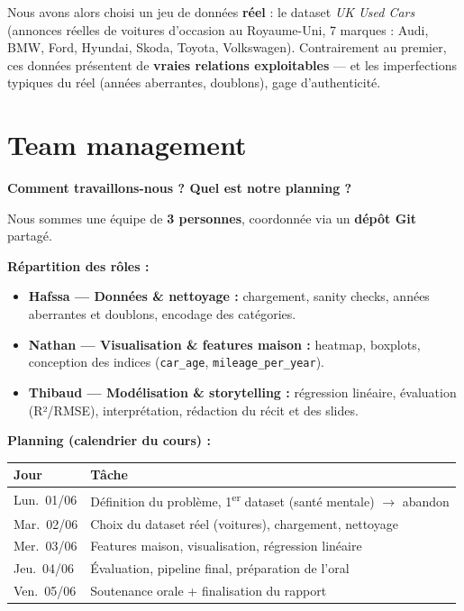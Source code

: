 \documentclass[11pt,a4paper]{article}
\begin{document}
Nous avons alors choisi un jeu de données \textbf{réel} : le dataset \textit{UK Used
Cars} (annonces réelles de voitures d'occasion au Royaume-Uni, 7 marques : Audi, BMW,
Ford, Hyundai, Skoda, Toyota, Volkswagen). Contrairement au premier, ces données
présentent de \textbf{vraies relations exploitables} --- et les imperfections typiques du
réel (années aberrantes, doublons), gage d'authenticité.

\section{Team management}

\noindent\textbf{Comment travaillons-nous ? Quel est notre planning ?}

\medskip
Nous sommes une équipe de \textbf{3 personnes}, coordonnée via un \textbf{dépôt Git}
partagé.

\medskip
\noindent\textbf{Répartition des rôles :}
\begin{itemize}[nosep,leftmargin=1.4em]
  \item \textbf{Hafssa --- Données \& nettoyage :} chargement, sanity checks, années
    aberrantes et doublons, encodage des catégories.
  \item \textbf{Nathan --- Visualisation \& features maison :} heatmap, boxplots,
    conception des indices (\texttt{car\_age}, \texttt{mileage\_per\_year}).
  \item \textbf{Thibaud --- Modélisation \& storytelling :} régression linéaire,
    évaluation (R²/RMSE), interprétation, rédaction du récit et des slides.
\end{itemize}

\medskip
\noindent\textbf{Planning (calendrier du cours) :}
\begin{center}
\begin{tabular}{@{}ll@{}}
  \toprule
  \textbf{Jour} & \textbf{Tâche} \\
  \midrule
  Lun.\ 01/06 & Définition du problème, 1\textsuperscript{er} dataset (santé mentale) $\to$ abandon \\
  Mar.\ 02/06 & Choix du dataset réel (voitures), chargement, nettoyage \\
  Mer.\ 03/06 & Features maison, visualisation, régression linéaire \\
  Jeu.\ 04/06 & Évaluation, pipeline final, préparation de l'oral \\
  Ven.\ 05/06 & Soutenance orale + finalisation du rapport \\
  \bottomrule
\end{tabular}
\end{center}
\end{document}
